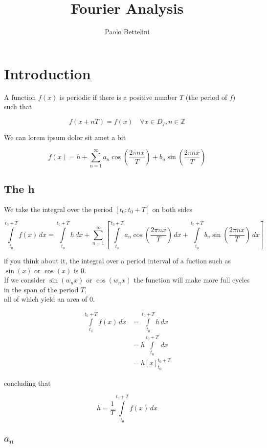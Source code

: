 \documentclass{article}
\title{Fourier Analysis}
\author{Paolo Bettelini}
\date{}
\newcommand{\integral}[4]{\int\limits_{#1}^{#2} #3\,d#4}
\begin{document}
\maketitle
\tableofcontents
\pagebreak

\section{Introduction}

A function \(f(x)\) is periodic if there is a positive number \(T\) (the period of \(f\)) such that

\[
    f(x + nT) = f(x)
    \quad \forall x \in D_f, n \in \mathbb{Z}
\]

We can lorem ipsum dolor sit amet a bit

\[
    f(x) = h + \sum_{n=1}^{\infty}
        a_n \cos\left(\frac{2\pi n x}{T}\right) +
        b_n \sin\left(\frac{2\pi n x}{T}\right)
\]

\subsection{The h}

We take the integral over the period \([t_0;t_0+T]\) on both sides

\[
    \integral{t_0}{t_0+T}{f(x)}{x} =
    \integral{t_0}{t_0+T}{h}{x} +
    \sum_{n=1}^{\infty}
    \left[
    \integral{t_0}{t_0+T}{a_n \cos\left(\frac{2\pi n x}{T}\right)}{x} +
    \integral{t_0}{t_0+T}{b_n \sin\left(\frac{2\pi n x}{T}\right)}{x}
    \right]
\]

if you think about it, the integral over a period interval of a fuction such as \(\sin(x)\) or \(\cos(x)\) is 0. \\
If we consider \(\sin(w_n x)\) or \(\cos(w_n x)\) the function will make more full cycles in the span of the period \(T\), \\
all of which yield an area of 0.

\begin{align*}
    \integral{t_0}{t_0+T}{f(x)}{x} &=
    \integral{t_0}{t_0+T}{h}{x} \\
    &= h \integral{t_0}{t_0+T}{}{x} \\
    &= h {\left[x\right]}^{t_0+T}_{t_0}
\end{align*}

concluding that

\[
    h = \frac{1}{T} \integral{t_0}{t_0+T}{f(x)}{x}
\]

\subsection{\(a_n\)}
\end{document}
